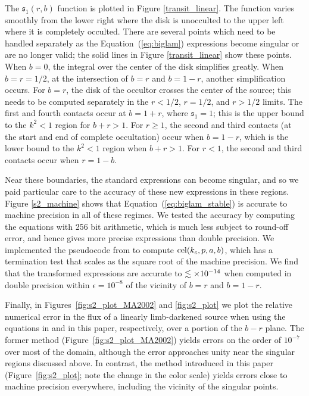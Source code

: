 \documentclass[modern]{aastex61}
\begin{document}
The $\mathfrak{s}_1(r,b)$ function is plotted in Figure \ref{transit_linear}. The
function varies smoothly from the lower right where the disk is
unocculted to the upper left where it is completely occulted.
There are several points which need to be handled separately as
the Equation~(\ref{eq:biglam}) expressions become singular or are
no longer valid;  the solid lines in Figure \ref{transit_linear} show
these points.  When $b=0$, the integral over the center of the
disk simplifies greatly.  When $b=r=1/2$, at the intersection of
$b=r$ and $b=1-r$, another simplification occurs.  For $b=r$,
the disk of the occultor crosses the center of the source;
this needs to be computed separately in the $r<1/2$, $r=1/2$,
and $r>1/2$ limits.  The first and fourth contacts occur at
$b=1+r$, where $\mathfrak{s}_1=1$;  this is the upper bound to the $k^2 < 1$
region for $b+r >1$.
For $r \ge 1$, the second and third contacts (at the start and
end of complete occultation) occur when $b=1-r$, which is the
lower  bound to the $k^2<1$ region when $b+r >1$.
For $r < 1$, the second and third contacts occur when $r=1-b$.

Near these boundaries, the standard \citet{MandelAgol2002} expressions
can become singular, and so we paid particular care to the accuracy of these
new expressions in these regions.  Figure \ref{s2_machine} shows
that Equation~(\ref{eq:biglam_stable}) is accurate to machine
precision in all of these regimes.
We tested the accuracy by computing the equations with 256 bit
arithmetic, which is much less subject to round-off error, and
hence gives more precise expressions than double precision.  We implemented the
pseudocode from \citet{Bulirsch1969} to compute ${\rm cel}(k_c,p,a,b)$,
which has a termination test that scales as the square root of
the machine precision.  We find that the transformed expressions
are accurate to $\lesssim \times 10^{-14}$ when computed in double precision
within $\epsilon = 10^{-8}$ of the vicinity of $b=r$ and $b=1-r$.

Finally, in Figures~\ref{fig:s2_plot_MA2002} and \ref{fig:s2_plot} we plot
the relative numerical error in the flux of a linearly limb-darkened source
when using the equations in \citet{MandelAgol2002} and in this paper,
respectively, over a portion of the $b-r$ plane. The former method 
(Figure~\ref{fig:s2_plot_MA2002}) yields errors
on the order of $10^{-7}$ over most of the domain, although the error approaches
unity near the singular regions discussed above. In contrast, the method introduced
in this paper (Figure~\ref{fig:s2_plot}; note the change in the color scale)
yields errors close to machine precision everywhere, including the vicinity of the
singular points.
\end{document}
